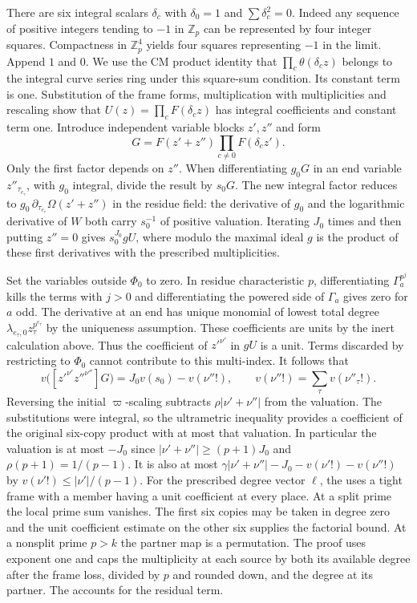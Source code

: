 There are six integral scalars $\delta_c$ with $\delta_0=1$ and
$\sum\delta_c^2=0$. Indeed any sequence of positive integers tending to $-1$ in $\mathbb Z_p$ can be represented by four integer squares. Compactness in $\mathbb Z_p^4$ yields four squares representing $-1$ in the limit. Append $1$ and $0$. We use the CM product identity that $\prod_c\theta(\delta_c z)$ belongs to the integral curve series ring under this square-sum condition. Its constant term is one. Substitution of the frame forms, multiplication with multiplicities and rescaling show that $U(z)=\prod_c F(\delta_c z)$ has integral coefficients and constant term one. Introduce independent variable blocks $z',z''$ and form
\[
 G=F(z'+z'')\prod_{c\ne0}F(\delta_c z').
\]
Only the first factor depends on $z''$. When differentiating $g_0G$ in an end variable $z''_{\tau_{e_\tau}}$, with $g_0$ integral, divide the result by $s_0G$. The new integral factor reduces to $g_0\,\partial_{\tau_{e_\tau}}\Omega(z'+z'')$ in the residue field: the derivative of $g_0$ and the logarithmic derivative of $W$ both carry $s_0^{-1}$ of positive valuation. Iterating $J_0$ times and then putting $z''=0$ gives $s_0^{J_0}gU$, where modulo the maximal ideal $g$ is the product of these first derivatives with the prescribed multiplicities.

Set the variables outside $\Phi_0$ to zero. In residue characteristic $p$, differentiating $\Gamma_a^{p^j}$ kills the terms with $j>0$ and differentiating the powered side of $\Gamma_a$ gives zero for $a$ odd. The derivative at an end has unique monomial of lowest total degree
$\lambda_{e_\tau,0}z_\tau^{p^{e_\tau}}$ by the uniqueness assumption.
These coefficients are units by the inert calculation above. Thus the coefficient of $z'^{\nu'}$ in $gU$ is a unit. Terms discarded by restricting to $\Phi_0$ cannot contribute to this multi-index. It follows that
\[
 v\big([z'^{\nu'}z''^{\nu''}]G\big)
 =J_0 v(s_0)-v(\nu''!),\qquad
 v(\nu''!)=\sum_\tau v(\nu''_\tau!).
\]
Reversing the initial $\varpi$-scaling subtracts $\rho|\nu'+\nu''|$ from the valuation. The substitutions were integral, so the ultrametric inequality provides a coefficient of the original six-copy product with at most that valuation. In particular the valuation is at most $-J_0$ since
$|\nu'+\nu''|\ge(p+1)J_0$ and $\rho(p+1)=1/(p-1)$.
It is also at most
$\gamma|\nu'+\nu''|-J_0-v(\nu'!)-v(\nu''!)$ by
$v(\nu'!)\le |\nu'|/(p-1)$.
For the prescribed degree vector \(\ell\), the
uses a tight frame with a member having a unit coefficient at every place.
At a split prime the local prime sum vanishes. The first six copies may be
taken in degree zero and the unit coefficient estimate on the other six
supplies the factorial bound. At a nonsplit prime \(p>k\) the partner map
is a permutation. The proof uses exponent one and caps the multiplicity
at each source by both its available degree after the frame loss, divided
by \(p\) and rounded down, and the degree at its partner. The
accounts for the residual term.


